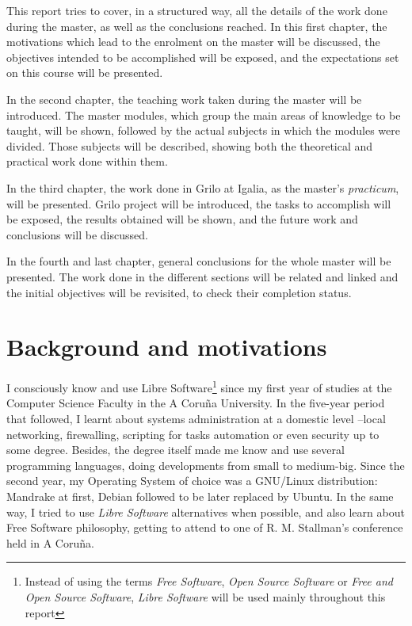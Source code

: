 This report tries to cover, in a structured way, all the details of the work done
during the master, as well as the conclusions reached. In this first chapter, the
motivations which lead to the enrolment on the master will be discussed, the objectives
intended to be accomplished will be exposed, and the expectations set on this course
will be presented.

In the second chapter, the teaching work taken during the master will be introduced.
The master modules, which group the main areas of knowledge to be taught, will be
shown, followed by the actual subjects in which the modules were divided. Those subjects
will be described, showing both the theoretical and practical work done within them.

In the third chapter, the work done in Grilo at Igalia, as the master's
{\it practicum}, will be presented. Grilo project will be introduced, the tasks to
accomplish will be exposed, the results obtained will be shown, and the future
work and conclusions will be discussed.

In the fourth and last chapter, general conclusions for the whole master will be
presented. The work done in the different sections will be related and linked and the
initial objectives will be revisited, to check their completion status.

\section{Background and motivations}

I consciously know and use Libre Software\footnote{Instead of using the terms {\it Free Software},
{\it Open Source Software} or {\it Free and Open Source Software}, {\it Libre Software}
will be used mainly throughout this report} since my first year of studies at the Computer
Science Faculty in the A Coru\~na University. In the five-year period that followed,
I learnt about systems administration at a domestic level --local networking, firewalling,
scripting for tasks automation or even security up to some degree. Besides, the degree itself
made me know and use several programming languages, doing developments from small to medium-big.
Since the second year, my Operating System of choice was a GNU/Linux distribution: Mandrake at first,
Debian followed to be later replaced by Ubuntu. In the same way, I tried to use {\it Libre Software}
alternatives when possible, and also learn about Free Software philosophy, getting
to attend to one of R. M. Stallman's conference held in A Coru\~na.

